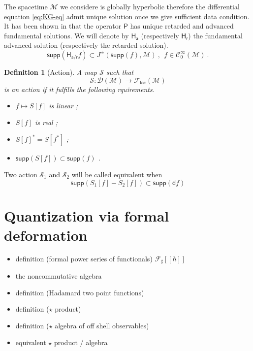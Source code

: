 \documentclass[10pt]{book}
\newcommand{\supp}{\mathsf{supp}}
\newcommand{\Ccal}{\mathcal{C}}
\newcommand{\Dcal}{\mathcal{D}}
\newcommand{\Fcal}{\mathcal{F}}
\newcommand{\Mcal}{\mathcal{M}}
\newcommand{\Scal}{\mathcal{S}}
\newcommand{\Hsf}{\mathsf{H}}
\newcommand{\Psf}{\mathsf{P}}
\newcommand{\asf}{\mathsf{a}}
\newcommand{\dsf}{\mathsf{d}}
\newcommand{\rsf}{\mathsf{r}}
\theoremstyle{break}
\newtheorem{definition}{Definition}
\begin{document}
\bigskip


The spacetime $\Mcal$ we considere is globally hyperbolic therefore the differential equation \eqref{eq:KG-eq} admit unique solution once we give sufficient data condition. It has been shown in \cite{baer_wave_2008} that the operator $\Psf$ has unique retarded and advanced fundamental solutions. We will denote by $\Hsf_\asf$ (respectively $\Hsf_\rsf$) the fundamental advanced solution (respectively the retarded solution). 
%
\begin{equation*}
\supp\left( \Hsf_{\asf/\rsf} f \right) \subset J^{\pm}\left(\supp\left(f\right),\Mcal\right) \ , \ \ f \in \Ccal^\infty_0(\Mcal) \ . 
\end{equation*}
%



\begin{definition}[Action]
A map $\Scal$ such that
%
\begin{equation*}
\Scal : \Dcal(\Mcal) \to \Fcal_{\mathsf{loc}}(\Mcal) 
\end{equation*}
%
is an action if it fulfills the following rquirements.
%
\begin{itemize}
\item $f \mapsto S[f]$ is linear ;
\item $S[f]$ is real ;
\item $S[f]^\ast = S[f^\ast]$ ;
\item $\supp\left( S[f] \right) \subset \supp\left( f \right)$ .
\end{itemize}
%
\end{definition}

Two action $\Scal_1$ and $\Scal_2$ will be called equivalent when
%
\begin{equation*}
\supp\left( S_1[f] - S_2[f] \right) \subset \supp\left( \dsf f \right) 
\end{equation*}




\section{Quantization via formal deformation}

\begin{itemize}
\item definition (formal power series of functionals) $\Fcal_\sharp[[\hbar]]$
\item the noncommutative algebra
\item definition (Hadamard two point functions)
\item definition ($\star$ product)
\item definition ($\star$ algebra of off shell observables)
\item equivalent $\star$ product / algebra
\end{itemize}
\end{document}
